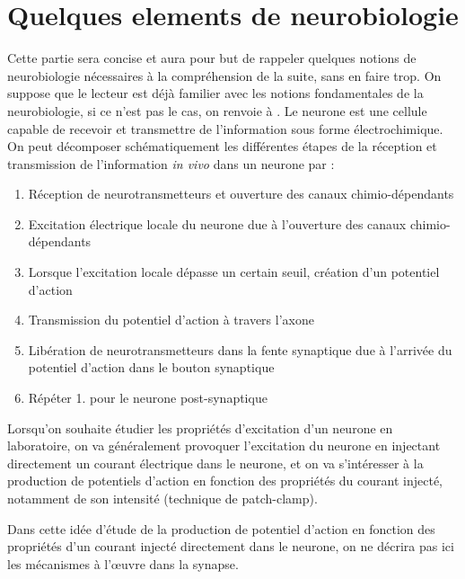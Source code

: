 \documentclass[12pt]{scrartcl}
\begin{document}
\section{Quelques elements de neurobiologie} \label{rappelneuro1}
Cette partie sera concise et aura pour but de rappeler quelques notions de neurobiologie nécessaires à la compréhension de la suite, sans en faire trop. On suppose que le lecteur est déjà familier avec les notions fondamentales de la neurobiologie, si ce n'est pas le cas, on renvoie à \cite{kandel2000principles}. 
Le neurone est une cellule capable de recevoir et transmettre de l'information sous forme électrochimique. On peut décomposer schématiquement les différentes étapes de la réception et transmission de l'information \textit{in vivo} dans un neurone par :
\begin{enumerate}
\item Réception de neurotransmetteurs et ouverture des canaux chimio-dépendants
\item Excitation électrique locale du neurone due à l'ouverture des canaux chimio-dépendants
\item Lorsque l'excitation locale dépasse un certain seuil, création d'un potentiel d'action
\item Transmission du potentiel d'action à travers l'axone
\item Libération de neurotransmetteurs dans la fente synaptique due à l'arrivée du potentiel d'action dans le bouton synaptique 
\item Répéter 1. pour le neurone post-synaptique
\end{enumerate}

Lorsqu'on souhaite étudier les propriétés d'excitation d'un neurone en laboratoire, on va généralement provoquer l'excitation du neurone en injectant directement un courant électrique dans le neurone, et on va s'intéresser à la production de potentiels d'action en fonction des propriétés du courant injecté, notamment de son intensité (technique de patch-clamp). 

Dans cette idée d'étude de la production de potentiel d'action en fonction des propriétés d'un courant injecté directement dans le neurone, on ne décrira pas ici les mécanismes à l'œuvre dans la synapse.
\end{document}
